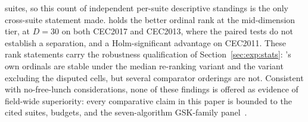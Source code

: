 suites, so this count of independent per-suite descriptive standings is
the only cross-suite statement made. \egsk{} holds the better ordinal
rank at the mid-dimension tier, at $D = 30$ on both CEC2017 and CEC2013, where
the paired tests do not establish a separation, and a Holm-significant
advantage on CEC2011.
These rank statements carry the robustness qualification of
Section~\ref{sec:exp:stats}: \dtgsk{}'s own ordinals are stable
under the median re-ranking variant and the variant excluding the disputed cells, but
several comparator orderings are not.
Consistent with no-free-lunch considerations, none of these findings
is offered as evidence of field-wide superiority: every comparative
claim in this paper is bounded to the cited suites, budgets, and the
seven-algorithm GSK-family panel~\cite{wolpert1997nfl}.

